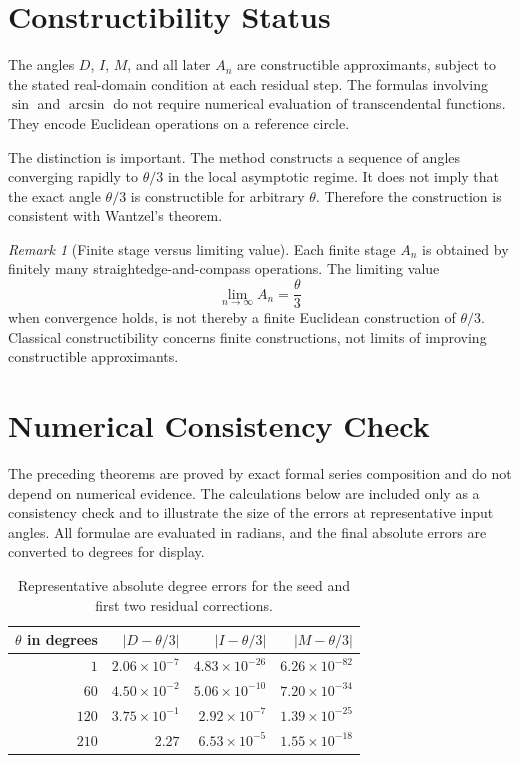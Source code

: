 \documentclass[11pt]{article}
\theoremstyle{remark}
\newtheorem{remark}{Remark}
\begin{document}
\section{Constructibility Status}

The angles $D$, $I$, $M$, and all later $A_n$ are constructible approximants, subject to
the stated real-domain condition at each residual step.  The formulas involving $\sin$ and
$\arcsin$ do not require numerical evaluation of transcendental functions.  They encode
Euclidean operations on a reference circle.

The distinction is important.  The method constructs a sequence of angles converging
rapidly to $\theta/3$ in the local asymptotic regime.  It does not imply that the exact
angle $\theta/3$ is constructible for arbitrary $\theta$.  Therefore the construction is
consistent with Wantzel's theorem.

\begin{remark}[Finite stage versus limiting value]
Each finite stage $A_n$ is obtained by finitely many straightedge-and-compass operations.
The limiting value
\[
\lim_{n\to\infty}A_n
=
\frac{\theta}{3}
\]
when convergence holds, is not thereby a finite Euclidean construction of $\theta/3$.
Classical constructibility concerns finite constructions, not limits of improving
constructible approximants.
\end{remark}

\section{Numerical Consistency Check}
\label{sec:numerical-check}

The preceding theorems are proved by exact formal series composition and do not depend on numerical evidence. The calculations below are included only as a consistency check and to illustrate the size of the errors at representative input angles. All formulae are evaluated in radians, and the final absolute errors are converted to degrees for display.

\begin{table}[h]
\centering
\begin{tabular}{rrrr}
\toprule
$\theta$ in degrees & $|D-\theta/3|$ & $|I-\theta/3|$ & $|M-\theta/3|$ \\
\midrule
$1$   & $2.06\times 10^{-7}$  & $4.83\times 10^{-26}$ & $6.26\times 10^{-82}$ \\
$60$  & $4.50\times 10^{-2}$  & $5.06\times 10^{-10}$ & $7.20\times 10^{-34}$ \\
$120$ & $3.75\times 10^{-1}$  & $2.92\times 10^{-7}$  & $1.39\times 10^{-25}$ \\
$210$ & $2.27$                & $6.53\times 10^{-5}$  & $1.55\times 10^{-18}$ \\
\bottomrule
\end{tabular}
\caption{Representative absolute degree errors for the seed and first two residual corrections.}
\label{tab:numerical}
\end{table}
\end{document}
